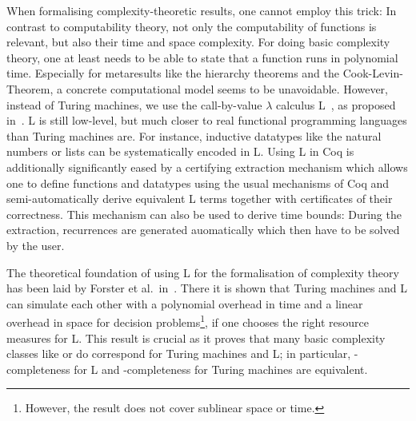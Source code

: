 When formalising complexity-theoretic results, one cannot employ this trick: In contrast to computability theory, not only the computability of functions is relevant, but also their time and space complexity. For doing basic complexity theory, one at least needs to be able to state that a function runs in polynomial time.
Especially for metaresults like the hierarchy theorems and the Cook-Levin-Theorem, a concrete computational model seems to be unavoidable.
However, instead of Turing machines, we use the call-by-value $\lambda$ calculus L~\cite{ForsterSmolka:2017:L-Computability}, as proposed in~\cite{ForsterEtAl:2019:VerifiedTMs}. L is still low-level, but much closer to real functional programming languages than Turing machines are. For instance, inductive datatypes like the natural numbers or lists can be systematically encoded in L.
Using L in Coq is additionally significantly eased by a certifying extraction mechanism\cite{ForsterKunze:2019:Certifying-extraction} which allows one to define functions and datatypes using the usual mechanisms of Coq and semi-automatically derive equivalent L terms together with certificates of their correctness. This mechanism can also be used to derive time bounds: During the extraction, recurrences are generated auomatically which then have to be solved by the user. 

The theoretical foundation of using L for the formalisation of complexity theory has been laid by Forster et al.\ in~\cite{ForsterKunzeRoth:2019:wcbv-Reasonable}. There it is shown that Turing machines and L can simulate each other with a polynomial overhead in time and a linear overhead in space for decision problems\footnote{However, the result does not cover sublinear space or time.}, if one chooses the right resource measures for L.
This result is crucial as it proves that many basic complexity classes like \NP{} or \PC{} do correspond for Turing machines and L; in particular, \NP{}-completeness for L and \NP{}-completeness for Turing machines are equivalent.

